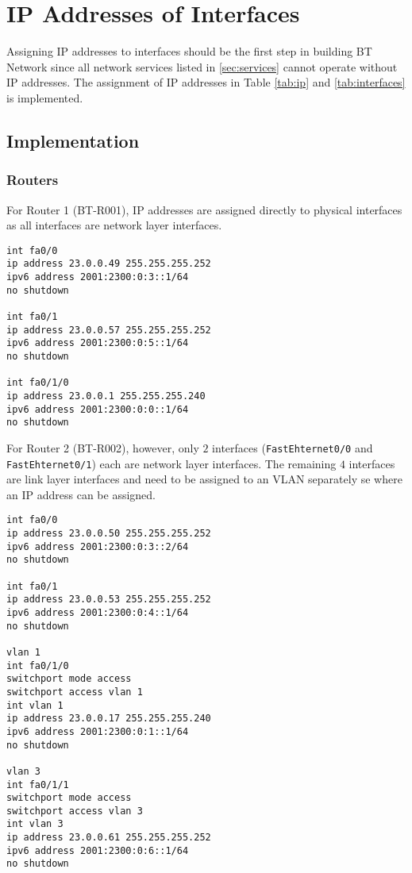 \section{IP Addresses of Interfaces}
\label{sec:IP}


Assigning IP addresses\citep{rfc791}\citep{rfc2460} to interfaces should be the first step in building BT Network since all network services listed in \ref{sec:services} cannot operate without IP addresses.
The assignment of IP addresses in Table \ref{tab:ip} and \ref{tab:interfaces} is implemented.

\subsection{Implementation}

\subsubsection{Routers}

For Router 1 (BT-R001), IP addresses are assigned directly to physical interfaces as all interfaces are network layer interfaces.

\begin{lstlisting}
int fa0/0
ip address 23.0.0.49 255.255.255.252
ipv6 address 2001:2300:0:3::1/64
no shutdown

int fa0/1
ip address 23.0.0.57 255.255.255.252
ipv6 address 2001:2300:0:5::1/64
no shutdown

int fa0/1/0
ip address 23.0.0.1 255.255.255.240
ipv6 address 2001:2300:0:0::1/64
no shutdown
\end{lstlisting}

For Router 2 (BT-R002), however, only $2$ interfaces (\texttt{FastEhternet0/0} and \texttt{FastEhternet0/1}) each are network layer interfaces. The remaining $4$ interfaces are link layer interfaces and need to be assigned to an VLAN separately se where an IP address can be assigned. 

\begin{lstlisting}
int fa0/0
ip address 23.0.0.50 255.255.255.252
ipv6 address 2001:2300:0:3::2/64
no shutdown

int fa0/1
ip address 23.0.0.53 255.255.255.252
ipv6 address 2001:2300:0:4::1/64
no shutdown

vlan 1
int fa0/1/0
switchport mode access
switchport access vlan 1
int vlan 1
ip address 23.0.0.17 255.255.255.240
ipv6 address 2001:2300:0:1::1/64
no shutdown

vlan 3
int fa0/1/1
switchport mode access
switchport access vlan 3
int vlan 3
ip address 23.0.0.61 255.255.255.252
ipv6 address 2001:2300:0:6::1/64
no shutdown
\end{lstlisting}

